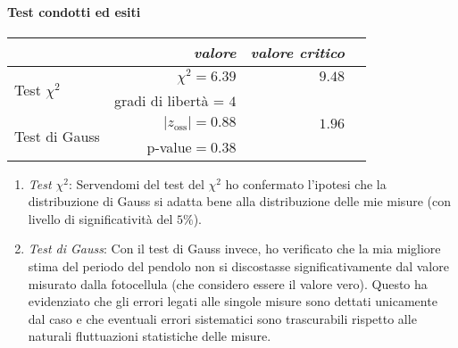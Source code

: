 \documentclass{article}
\begin{document}
	\paragraph{Test condotti ed esiti}
		\textcolor{white}{ }
	
		\begin{minipage}[c]{1\textwidth}
		\centering
		\renewcommand{\arraystretch}{1.5}
		\begin{tabular}{lrrl}
			& \textit{valore} & \textit{valore critico} & \\
			\hline
			\multirow{2}{8em}{Test $\chi^2$}& $\chi^2 = 6.39$ & $9.48$ & \\
			& gradi di libertà = $4$ & & \\
			\multirow{2}{8em}{Test di Gauss}& $|z_{\text{oss}}| = 0.88$  & $1.96$ & \\	
			&p-value$=0.38$ & & \\
		\end{tabular}
		\renewcommand{\arraystretch}{1}
	\end{minipage}
	\vspace{0.1cm}
	
	
	\begin{enumerate}
		\item \textit{Test $\chi^2$}: Servendomi del test del $\chi^2$ ho confermato l'ipotesi che la distribuzione di Gauss si adatta bene alla distribuzione delle mie misure (con livello di significatività del $5\%$). 
		\item \textit{Test di Gauss}: Con il test di Gauss invece, ho verificato che la mia migliore stima del periodo del pendolo non si discostasse significativamente dal valore misurato dalla fotocellula (che considero essere il valore vero). Questo ha evidenziato che gli errori legati alle singole misure sono dettati unicamente dal caso e che eventuali errori sistematici sono trascurabili rispetto alle naturali fluttuazioni statistiche delle misure.
	\end{enumerate}
	
\end{document}
